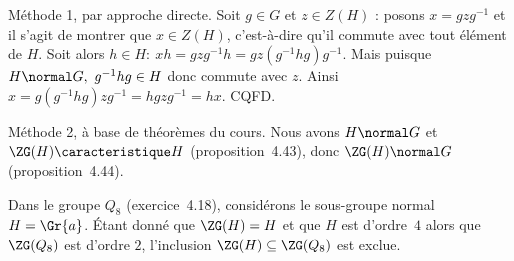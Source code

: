 
Méthode 1, par approche directe. Soit $g\in G$ et $z\in Z(H)$ : posons $x = gzg^{-1}$ et il s'agit de montrer que $x\in Z(H)$, c'est-à-dire qu'il commute avec tout élément de $H$.
Soit alors $h\in H :~ xh = gzg^{-1}h = gz(g^{-1}hg)g^{-1}$. Mais puisque $H \normal G,~ g^{-1}hg \in H$ donc commute avec $z$. Ainsi $x = g (g^{-1}hg)zg^{-1} = h gzg^{-1} = hx$. CQFD.


Méthode 2, à base de théorèmes du cours.
Nous avons $H\normal G$ et $\ZG(H)\caracteristique H$ (proposition~4.43), donc $\ZG(H)\normal G$ (proposition~4.44).

Dans le groupe $Q_8$ (exercice~4.18), considérons le sous-groupe normal $H = \Gr{a}$.
Étant donné que $\ZG(H) = H$ et que $H$ est d'ordre~$4$ alors que $\ZG(Q_8)$ est d'ordre $2$, l'inclusion $\ZG(H) \subseteq \ZG(Q_8)$ est exclue.
